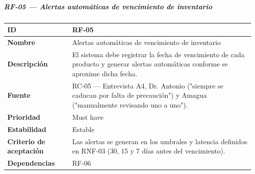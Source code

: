 \subparagraph{RF-05 --- Alertas automáticas de vencimiento de
inventario}\label{rf-05-alertas-automuxe1ticas-de-vencimiento-de-inventario}

{\def\LTcaptype{none} %
\begin{longtable}[]{@{}
  >{\raggedright\arraybackslash}p{}
  >{\raggedright\arraybackslash}p{}@{}}
\toprule\noalign{}
\begin{minipage}[b]{\linewidth}\raggedright
\textbf{ID}
\end{minipage} & \begin{minipage}[b]{\linewidth}\raggedright
RF-05
\end{minipage} \\
\midrule\noalign{}
\endhead
\bottomrule\noalign{}
\endlastfoot
\textbf{Nombre} & \begin{minipage}[t]{\linewidth}\raggedright
Alertas automáticas de vencimiento de inventario
\end{minipage} \\
\textbf{Descripción} & \begin{minipage}[t]{\linewidth}\raggedright
El sistema debe registrar la fecha de vencimiento de cada producto y
generar alertas automáticas conforme se aproxime dicha fecha.
\end{minipage} \\
\textbf{Fuente} & \begin{minipage}[t]{\linewidth}\raggedright
RC-05 --- Entrevista A4, Dr. Antonio ("siempre se caducan por falta de
precaución") y Amagua ("manualmente revisando uno a uno").
\end{minipage} \\
\textbf{Prioridad} & \begin{minipage}[t]{\linewidth}\raggedright
Must have
\end{minipage} \\
\textbf{Estabilidad} & \begin{minipage}[t]{\linewidth}\raggedright
Estable
\end{minipage} \\
\textbf{Criterio de aceptación} &
\begin{minipage}[t]{\linewidth}\raggedright
Las alertas se generan en los umbrales y latencia definidos en RNF-03
(30, 15 y 7 días antes del vencimiento).
\end{minipage} \\
\textbf{Dependencias} & \begin{minipage}[t]{\linewidth}\raggedright
RF-06
\end{minipage} \\
\end{longtable}
}

